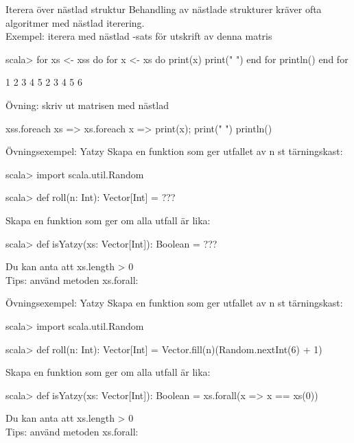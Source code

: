 \begin{Slide}{Iterera över nästlad struktur}\SlideFontSmall
  \vspace{1em}
  Behandling av nästlade strukturer kräver ofta algoritmer med nästlad iterering. \\
  Exempel: iterera med nästlad -sats för utskrift av denna matris \\

  \begin{REPL}
scala> for xs <- xss do
         for x <- xs do 
           print(x)
           print(" ")
         end for
         println()
       end for

1 2 3 4 5
2 3 4 5 6
\end{REPL}
Övning: skriv ut matrisen med nästlad \\
\pause
\begin{Code}
xss.foreach { xs => 
  xs.foreach { x => print(x); print(" ") }
  println()
}
\end{Code}
\end{Slide}


\begin{Slide}{Övningsexempel: Yatzy}\SlideFontSmall
Skapa en funktion  som ger utfallet av n st tärningskast:
\begin{REPL}
scala> import scala.util.Random

scala> def roll(n: Int): Vector[Int] = ???
\end{REPL}

Skapa en funktion  som ger  om alla utfall är lika:
\begin{REPL}
scala> def isYatzy(xs: Vector[Int]): Boolean = ???
\end{REPL}
Du kan anta att xs.length > 0\\
Tips: använd metoden xs.forall: \\
\end{Slide}


\begin{Slide}{Övningsexempel: Yatzy}\SlideFontSmall
Skapa en funktion  som ger utfallet av n st tärningskast:
\begin{REPL}
scala> import scala.util.Random

scala> def roll(n: Int): Vector[Int] = Vector.fill(n)(Random.nextInt(6) + 1)
\end{REPL}

Skapa en funktion  som ger  om alla utfall är lika:
\begin{REPL}
scala> def isYatzy(xs: Vector[Int]): Boolean = xs.forall(x => x == xs(0))
\end{REPL}
Du kan anta att xs.length > 0\\
Tips: använd metoden xs.forall: \\
\end{Slide}


